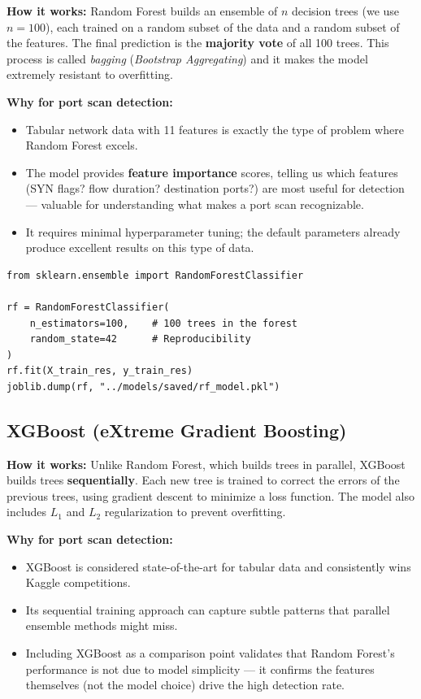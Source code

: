 \textbf{How it works:} Random Forest builds an ensemble of $n$ decision trees (we use $n=100$), each trained on a random subset of the data and a random subset of the features. The final prediction is the \textbf{majority vote} of all 100 trees. This process is called \textit{bagging} (\textit{Bootstrap Aggregating}) and it makes the model extremely resistant to overfitting.

\textbf{Why for port scan detection:}
\begin{itemize}
    \item Tabular network data with 11 features is exactly the type of problem where Random Forest excels.
    \item The model provides \textbf{feature importance} scores, telling us which features (SYN flags? flow duration? destination ports?) are most useful for detection --- valuable for understanding what makes a port scan recognizable.
    \item It requires minimal hyperparameter tuning; the default parameters already produce excellent results on this type of data.
\end{itemize}

\begin{lstlisting}[caption={Random Forest training}]
from sklearn.ensemble import RandomForestClassifier

rf = RandomForestClassifier(
    n_estimators=100,    # 100 trees in the forest
    random_state=42      # Reproducibility
)
rf.fit(X_train_res, y_train_res)
joblib.dump(rf, "../models/saved/rf_model.pkl")
\end{lstlisting}

\subsection{XGBoost (eXtreme Gradient Boosting)}

\textbf{How it works:} Unlike Random Forest, which builds trees in parallel, XGBoost builds trees \textbf{sequentially}. Each new tree is trained to correct the errors of the previous trees, using gradient descent to minimize a loss function. The model also includes $L_1$ and $L_2$ regularization to prevent overfitting.

\textbf{Why for port scan detection:}
\begin{itemize}
    \item XGBoost is considered state-of-the-art for tabular data and consistently wins Kaggle competitions.
    \item Its sequential training approach can capture subtle patterns that parallel ensemble methods might miss.
    \item Including XGBoost as a comparison point validates that Random Forest's performance is not due to model simplicity --- it confirms the features themselves (not the model choice) drive the high detection rate.
\end{itemize}

